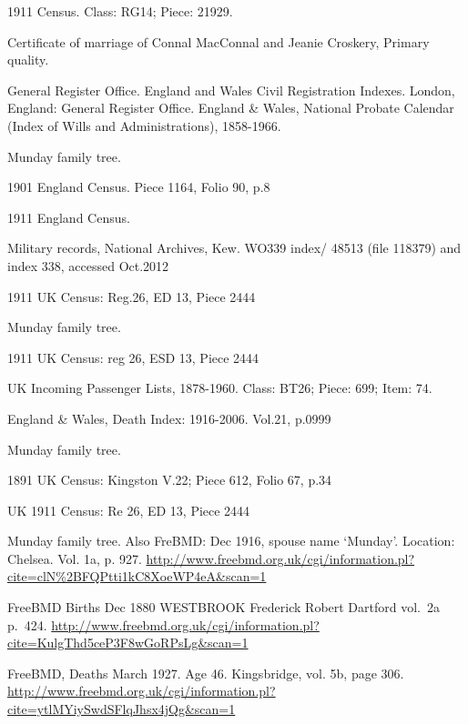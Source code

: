 \begin{thebibliography}{99}
	1911 Census. Class: RG14; Piece: 21929.
	
	Certificate of marriage of Connal MacConnal and Jeanie Croskery, Primary quality.
	
	General Register Office. England and Wales Civil Registration Indexes. London, England: General Register Office.
	England \& Wales, National Probate Calendar (Index of Wills and Administrations), 1858-1966. 
	
	Munday family tree. 
	
	 1901 England Census. Piece 1164, Folio 90, p.8

	1911 England Census.
	
	Military records, National Archives, Kew.
	WO339 index/ 48513 (file 118379) and index 338, accessed Oct.2012
	
	1911 UK Census: Reg.26, ED 13, Piece 2444 
	
	Munday family tree. 
	
	1911 UK Census: reg 26, ESD 13, Piece 2444 
	
	 UK Incoming Passenger Lists, 1878-1960. Class: BT26; Piece: 699; Item: 74.
	 
	England \& Wales, Death Index: 1916-2006. Vol.21, p.0999
	
	Munday family tree. 

	1891 UK Census: Kingston V.22; Piece 612, Folio 67, p.34 
	
	UK 1911 Census: Re 26, ED 13, Piece 2444
	
	Munday family tree.
	Also FreBMD: Dec 1916, spouse name `Munday'. Location: Chelsea. Vol. 1a, p. 927.
	\url{http://www.freebmd.org.uk/cgi/information.pl?cite=clN\%2BFQPtti1kC8XoeWP4eA&scan=1}

	FreeBMD Births Dec 1880
	WESTBROOK Frederick Robert Dartford vol.~2a p.~424.
	\url{http://www.freebmd.org.uk/cgi/information.pl?cite=KulgThd5ceP3F8wGoRPsLg&scan=1}

	 FreeBMD, Deaths March 1927. Age 46. Kingsbridge, vol. 5b, page 306.
	\url{http://www.freebmd.org.uk/cgi/information.pl?cite=ytlMYiySwdSFlqJhsx4jQg&scan=1}


\end{thebibliography}
